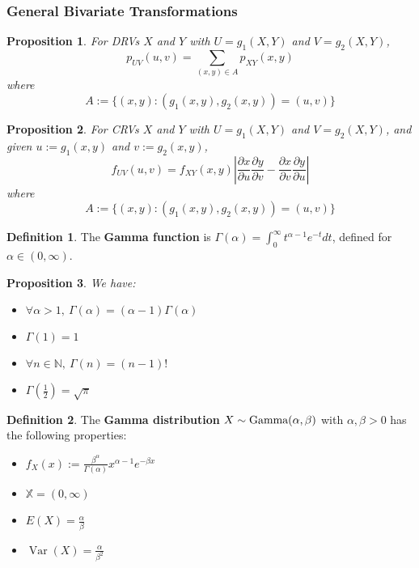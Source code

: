 \documentclass[12pt]{article}
\newtheorem*{prop*}{Proposition}
\theoremstyle{definition}
\newtheorem*{defn*}{Definition}
\newcommand{\N}{\mathbb{N}}
\newcommand{\X}{\mathbb{X}}
\DeclareMathOperator{\Var}{Var}
\begin{document}

\subsubsection{General Bivariate Transformations}

\begin{prop*}
  For DRVs $X$ and $Y$ with $U = g_1(X, Y)$ and $V = g_2(X, Y)$,
  $$p_{UV}(u, v) = \sum_{(x, y) \in A}p_{XY}(x, y)$$
  where
  $$A := \{(x, y) : (g_1(x, y), g_2(x, y)) = (u, v)\}$$
\end{prop*}

\begin{prop*}
  For CRVs $X$ and $Y$ with $U = g_1(X, Y)$ and $V = g_2(X, Y)$, and given $u := g_1(x, y)$ and $v := g_2(x, y)$,
  $$f_{UV}(u, v) = f_{XY}(x, y)\left\lvert\frac{\partial x}{\partial u}\frac{\partial y}{\partial v} - \frac{\partial x}{\partial v}\frac{\partial y}{\partial u}\right\rvert$$
  where
  $$A := \{(x, y) : (g_1(x, y), g_2(x, y)) = (u, v)\}$$
\end{prop*}

\begin{defn*}
  The \textbf{Gamma function} is $\Gamma(\alpha) = \int_0^{\infty}t^{\alpha - 1}e^{-t}dt$, defined for $\alpha \in (0, \infty)$.
\end{defn*}

\begin{prop*}
  We have:
  \begin{itemize}
    \item $\forall \alpha > 1,\ \Gamma(\alpha) = (\alpha - 1)\Gamma(\alpha)$
    \item $\Gamma(1) = 1$
    \item $\forall n \in \N,\ \Gamma(n) = (n - 1)!$
    \item $\Gamma\left(\frac{1}{2}\right) = \sqrt{\pi}$
  \end{itemize}
\end{prop*}

\begin{defn*}
  The \textbf{Gamma distribution} $X \sim \textnormal{Gamma}(\alpha, \beta)$ with $\alpha, \beta > 0$ has the following properties:
  \begin{itemize}
    \item $f_X(x) := \frac{\beta^{\alpha}}{\Gamma(\alpha)}x^{\alpha - 1}e^{-\beta x}$
    \item $\X = (0, \infty)$
    \item $E(X) = \frac{\alpha}{\beta}$
    \item $\Var(X) = \frac{\alpha}{\beta^2}$
  \end{itemize}
\end{defn*}
\end{document}

